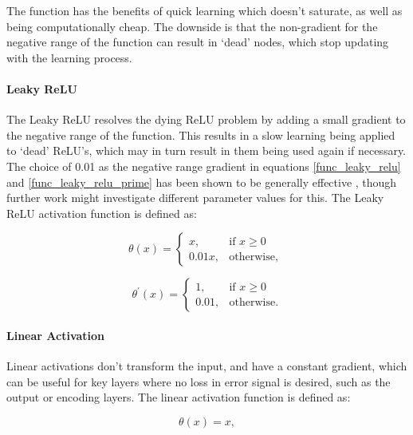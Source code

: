 \documentclass[a4paper,11pt,oneside]{article}
\theoremstyle{plain}
\theoremstyle{definition}
\begin{document}
	The function has the benefits of quick learning which doesn't saturate, as well as being computationally cheap. The downside is that the non-gradient for the negative range of the function can result in `dead' nodes, which stop updating with the learning process.
	
	\paragraph{Leaky ReLU}
	
	The Leaky ReLU resolves the dying ReLU problem by adding a small gradient to the negative range of the function. This results in a slow learning being applied to `dead' ReLU's, which may in turn result in them being used again if necessary. The choice of 0.01 as the negative range gradient in equations \eqref{func_leaky_relu} and \eqref{func_leaky_relu_prime} has been shown to be generally effective \citep{Maas}, though further work might investigate different parameter values for this. The Leaky ReLU activation function is defined as:
	

	\[
	\theta(x)= 
	\begin{cases}
	x,& \text{if } x\geq 0\\
	0.01x,              & \text{otherwise, }
	\end{cases}
	\]
	\begin{equation}\label{func_leaky_relu}
	\end{equation}
	
	\[
	\theta^\prime(x)= 
	\begin{cases}
	1,& \text{if } x\geq 0\\
	0.01,              & \text{otherwise.}
	\end{cases}
	\]
		\begin{equation}\label{func_leaky_relu_prime}
	\end{equation}
	
	\paragraph{Linear Activation}
	
	Linear activations don't transform the input, and have a constant gradient, which can be useful for key layers where no loss in error signal is desired, such as the output or encoding layers. The linear activation function is defined as:
	
	\begin{equation}\label{func_linear}
	\theta(x) = x, 
	\end{equation}
	
\end{document}
